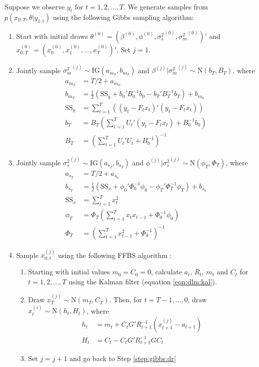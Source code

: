Suppose we observe $y_t$ for $t = 1,2,\ldots,T$. We generate samples from $p(x_{0:T},\theta|y_{1:t})$ using the following Gibbs sampling algorithm:
\begin{enumerate}
\item Start with initial draws $\theta^{(0)} = (\beta^{(0)}, \phi^{(0)}, {\sigma^2_s}^{(0)}, {\sigma^2_m}^{(0)})'$ and \\ $x^{(0)}_{0:T} = (x^{(0)}_0, x^{(0)}_1, \ldots, x^{(0)}_T)'$. Set $j = 1$.
\item \label{step:gibbs:dr:beta} Jointly sample ${\sigma^2_m}^{(j)} \sim \mbox{IG}(a_{m_T}, b_{m_T})$ and $\beta^{(j)}|{\sigma^2_m}^{(j)} \sim \mbox{N}(b_T,B_T)$, where
\begin{align}
a_{m_T} &= T/2 + a_{m_0} \label{eqn:dr:am} \\
b_{m_T} &= \frac{1}{2}(\mbox{SS}_y + b_0'B_0^{-1}b_0 - b_T'B_T^{-1}b_T) + b_{m_0} \label{eqn:dr:bm} \\
\mbox{SS}_y &= \sum^T_{t=1} \left((y_t - F_tx_t)'(y_t - F_tx_t)\right) \label{eqn:dr:ssy} \\
b_T &= B_T\left( \sum^T_{t=1} U_t'(y_t - F_tx_t) + B_0^{-1}b_0\right) \label{eqn:dr:b} \\
B_T &= \left(\sum^T_{t=1} U_t'U_t + B_0^{-1}\right)^{-1} \label{eqn:dr:B}
\end{align}
\item \label{step:gibbs:dr:phi} Jointly sample ${\sigma^2_s}^{(j)} \sim \mbox{IG}(a_{s_T}, b_{s_T})$ and $\phi^{(j)}|{\sigma^2_s}^{(j)} \sim \mbox{N}(\phi_T,\Phi_T)$, where
\begin{align}
a_{s_T} &= T/2 + a_{s_0} \label{eqn:dr:as} \\
b_{s_T} &= \frac{1}{2}(\mbox{SS}_x + \phi_0'\Phi_0^{-1}\phi_0 - \phi_T'\Phi_T^{-1}\phi_T) + b_{s_0} \label{eqn:dr:bs} \\
\mbox{SS}_x &= \sum^T_{t=1} x_t^2 \label{eqn:dr:ssx} \\
\phi_T &= \Phi_T\left( \sum^T_{t=1} x_tx_{t-1} + \Phi_0^{-1}\phi_0\right) \label{eqn:dr:phi} \\
\Phi_T &= \left(\sum^T_{t=1} x_{t-1}^2 + \Phi_0^{-1}\right)^{-1} \label{eqn:dr:Phi}
\end{align}
\item \label{step:ffbs} Sample $x_{0:t}^{(j)}$ using the following FFBS algorithm \cite[Sec 4.4][]{petris:camp:2009:dynamic}:
\begin{enumerate}
\item Starting with initial values $m_0 = C_0 = 0$, calculate $a_t$, $R_t$, $m_t$ and $C_t$ for $t = 1,2,\ldots,T$ using the Kalman filter (equation \eqref{eqn:dlm:kal}).
\item Draw $x_T^{(j)} \sim \mbox{N}(m_T,C_T)$. Then, for $t = T-1,\ldots,0$, draw $x_t^{(i)} \sim \mbox{N}(h_t,H_t)$, where
    \begin{align*}
    h_t &= m_t + C_tG'R_{t+1}^{-1}(x_{t+1}^{(j)} - a_{t+1}) \\
    H_t &= C_t - C_tG'R_{t+1}^{-1}GC_t
    \end{align*}
\item Set $j = j + 1$ and go back to Step \ref{step:gibbs:dr}
\end{enumerate}
\end{enumerate}

